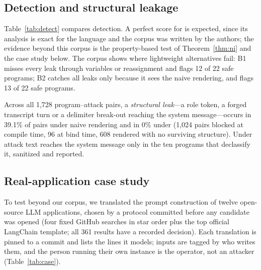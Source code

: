 \documentclass[conference]{IEEEtran}
\begin{document}
\subsection{Detection and structural leakage}
Table~\ref{tab:detect} compares detection. A perfect score for \TL{} is expected, since its analysis is exact for the language and the corpus was written by the authors; the evidence beyond this corpus is the property-based test of Theorem~\ref{thm:ni} and the case study below. The corpus shows where lightweight alternatives fail: B1 misses every leak through variables or reassignment and flags 12 of 22 safe programs; B2 catches all leaks only because it sees the naive rendering, and flags 13 of 22 safe programs.

\begin{table}[t]
\caption{Detection on the labelled corpus (unsafe = positive)}
\label{tab:detect}
\centering
{}
\end{table}

Across all 1{,}728 program--attack pairs, a \emph{structural leak}---a role token, a forged transcript turn or a delimiter break-out reaching the system message---occurs in 39.1\% of pairs under naive rendering and in 0\% under \TL{} (1{,}024 pairs blocked at compile time, 96 at bind time, 608 rendered with no surviving structure). Under \TL{} attack text reaches the system message only in the ten programs that declassify it, sanitized and reported.

\subsection{Real-application case study}\label{sec:case}
To test \TL{} beyond our corpus, we translated the prompt construction of twelve open-source LLM applications, chosen by a protocol committed before any candidate was opened (four fixed GitHub searches in star order plus the top official LangChain template; all 361 results have a recorded decision). Each translation is pinned to a commit and lists the lines it models; inputs are tagged by who writes them, and the person running their own instance is the operator, not an attacker (Table~\ref{tab:case}).
\end{document}
